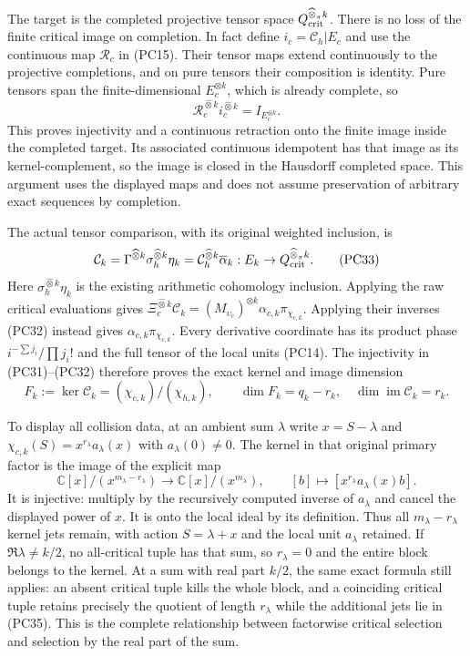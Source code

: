 \documentclass{article}
\begin{document}
The target is the completed projective tensor space
$Q_{\rm crit}^{\widehat\otimes_\pi k}$.  There is no loss of the
finite critical image on completion.  In fact define
$i_c=\mathcal C_h|E_c$ and use the continuous map $\mathcal R_c$
in (PC15).  Their tensor maps extend continuously to the projective
completions, and on pure tensors their composition is identity.
Pure tensors span the finite-dimensional $E_c^{\otimes k}$, which
is already complete, so
\[
 \mathcal R_c^{\widehat\otimes k}
             i_c^{\widehat\otimes k}=I_{E_c^{\otimes k}}.
 \tag{PC32}
\]
This proves injectivity and a continuous retraction onto the finite
image inside the completed target.  Its associated continuous
idempotent has that image as its kernel-complement, so the image is
closed in the Hausdorff completed space.  This argument uses the
displayed maps and does not assume preservation of arbitrary exact
sequences by completion.

The actual tensor comparison, with its original weighted inclusion, is
\[
 \mathcal C_k=
    \Gamma^{\widehat\otimes k}\sigma_h^{\widehat\otimes k}\eta_k
    =\mathcal C_h^{\widehat\otimes k}\overline\alpha_k:
        E_k\to Q_{\rm crit}^{\widehat\otimes_\pi k}.
 \tag{PC33}
\]
Here $\sigma_h^{\widehat\otimes k}\eta_k$ is the existing arithmetic
cohomology inclusion.  Applying the raw critical evaluations gives
$\Xi_c^{\widehat\otimes k}\mathcal C_k=
(M_{\upsilon_c})^{\otimes k}\alpha_{c,k}\pi_{\chi_{c,k}}$.
Applying their inverses (PC32) instead gives
$\alpha_{c,k}\pi_{\chi_{c,k}}$.  Every derivative coordinate has
its product phase $i^{-\sum j_i}/\prod j_i!$ and the full tensor
of the local units (PC14).  The injectivity in (PC31)--(PC32)
therefore proves the exact kernel and image dimension
\[
 \boxed{F_k:=\ker\mathcal C_k=(\chi_{c,k})/(\chi_{h,k}),
       \qquad\dim F_k=q_k-r_k,\quad
       \dim\operatorname{im}\mathcal C_k=r_k.}
 \tag{PC34}
\]

To display all collision data, at an ambient sum $\lambda$ write
$x=S-\lambda$ and
$\chi_{c,k}(S)=x^{r_\lambda}a_\lambda(x)$ with
$a_\lambda(0)\ne0$.  The kernel in that original primary factor is
the image of the explicit map
\[
 \mathbb C[x]/(x^{m_\lambda-r_\lambda})
  \longrightarrow\mathbb C[x]/(x^{m_\lambda}),\qquad
 [b]\longmapsto[x^{r_\lambda}a_\lambda(x)b].
 \tag{PC35}
\]
It is injective: multiply by the recursively computed inverse of
$a_\lambda$ and cancel the displayed power of $x$.
It is onto the local ideal by its definition.  Thus all
$m_\lambda-r_\lambda$ kernel jets remain, with action
$S=\lambda+x$ and the local unit $a_\lambda$ retained.
If $\Re\lambda\ne k/2$, no all-critical tuple has that sum,
so $r_\lambda=0$ and the entire block belongs to the kernel.
At a sum with real part $k/2$, the same exact formula still
applies: an absent critical tuple kills the whole block, and a
coinciding critical tuple retains precisely the quotient of length
$r_\lambda$ while the additional jets lie in (PC35).
This is the complete relationship between factorwise critical
selection and selection by the real part of the sum.
\end{document}

